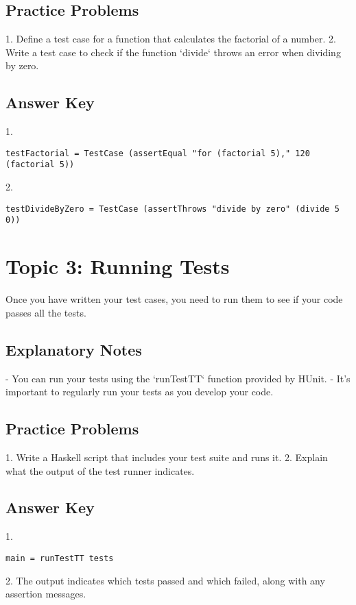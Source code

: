 \documentclass{article}
\begin{document}
\subsection*{Practice Problems}
1. Define a test case for a function that calculates the factorial of a number.
2. Write a test case to check if the function `divide` throws an error when dividing by zero.

\subsection*{Answer Key}
1. 
\begin{verbatim}
testFactorial = TestCase (assertEqual "for (factorial 5)," 120 (factorial 5))
\end{verbatim}
2. 
\begin{verbatim}
testDivideByZero = TestCase (assertThrows "divide by zero" (divide 5 0))
\end{verbatim}

\section*{Topic 3: Running Tests}
Once you have written your test cases, you need to run them to see if your code passes all the tests. 

\subsection*{Explanatory Notes}
- You can run your tests using the `runTestTT` function provided by HUnit.
- It's important to regularly run your tests as you develop your code.

\subsection*{Practice Problems}
1. Write a Haskell script that includes your test suite and runs it.
2. Explain what the output of the test runner indicates.

\subsection*{Answer Key}
1. 
\begin{verbatim}
main = runTestTT tests
\end{verbatim}
2. The output indicates which tests passed and which failed, along with any assertion messages.
\end{document}
